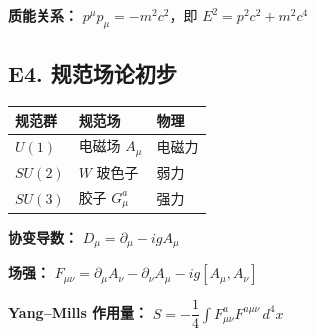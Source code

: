 \textbf{质能关系：} $p^\mu p_\mu = -m^2 c^2$，即 $E^2 = p^2 c^2 + m^2 c^4$

\subsection{E4. 规范场论初步}

\begin{center}
\begin{tabular}{lll}
\toprule
\textbf{规范群} & \textbf{规范场} & \textbf{物理} \\
\midrule
$U(1)$ & 电磁场 $A_\mu$ & 电磁力 \\
$SU(2)$ & $W$ 玻色子 & 弱力 \\
$SU(3)$ & 胶子 $G_\mu^a$ & 强力 \\
\bottomrule
\end{tabular}
\end{center}

\textbf{协变导数：} $D_\mu = \partial_\mu - igA_\mu$

\textbf{场强：} $F_{\mu\nu} = \partial_\mu A_\nu - \partial_\nu A_\mu - ig[A_\mu, A_\nu]$

\textbf{Yang--Mills 作用量：} $S = -\dfrac{1}{4}\displaystyle\int F_{\mu\nu}^a F^{a\mu\nu}\,d^4x$